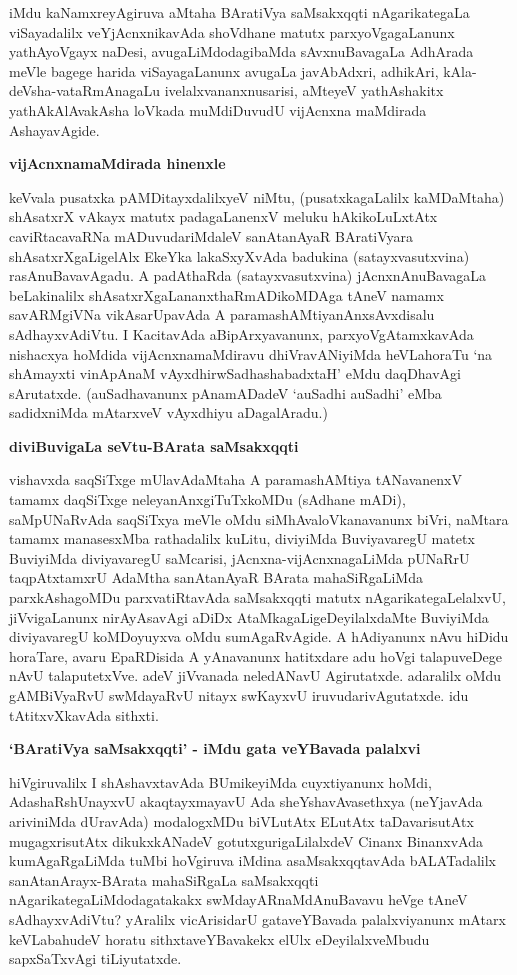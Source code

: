 iMdu kaNamxreyAgiruva aMtaha BAratiVya saMsakxqqti nAgarikategaLa viSayadalilx veYjAcnxnikavAda shoVdhane matutx parxyoVgagaLanunx yathAyoVgayx naDesi, avugaLiMdodagibaMda sAvxnuBavagaLa AdhArada meVle bagege harida viSayagaLanunx avugaLa javAbAdxri, adhikAri, kAla-deVsha-vataRmAnagaLu ivelalxvananxnusarisi, aMteyeV yathAshakitx yathAkAlAvakAsha loVkada muMdiDuvudU vijAcnxna maMdirada AshayavAgide.

\textbf{vijAcnxnamaMdirada hinenxle}

keVvala pusatxka pAMDitayxdalilxyeV niMtu, (pusatxkagaLalilx kaMDaMtaha) shAsatxrX vAkayx matutx padagaLanenxV meluku hAkikoLuLxtAtx caviRtacavaRNa mADuvudariMdaleV sanAtanAyaR BAratiVyara shAsatxrXgaLigelAlx EkeYka lakaSxyXvAda badukina (satayxvasutxvina) rasAnuBavavAgadu. A padAthaRda (satayxvasutxvina) jAcnxnAnuBavagaLa beLakinalilx shAsatxrXgaLananxthaRmADikoMDAga tAneV namamx 
savARMgiVNa vikAsarUpavAda A paramashAMtiyanAnxsAvxdisalu sAdhayxvAdiVtu. I KacitavAda aBipArxyavanunx, parxyoVgAtamxkavAda nishacxya hoMdida vijAcnxnamaMdiravu dhiVravANiyiMda heVLahoraTu `na shAmayxti vinApAnaM vAyxdhirwSadhashabadxtaH' eMdu daqDhavAgi sArutatxde. (auSadhavanunx pAnamADadeV `auSadhi auSadhi' eMba sadidxniMda mAtarxveV vAyxdhiyu aDagalAradu.)

\textbf{diviBuvigaLa seVtu-BArata saMsakxqqti}

vishavxda saqSiTxge mUlavAdaMtaha A paramashAMtiya tANavanenxV tamamx daqSiTxge neleyanAnxgiTuTxkoMDu (sAdhane mADi), saMpUNaRvAda saqSiTxya meVle oMdu siMhAvaloVkanavanunx biVri, naMtara tamamx manasesxMba rathadalilx kuLitu, diviyiMda BuviyavaregU matetx BuviyiMda diviyavaregU saMcarisi, jAcnxna-vijAcnxnagaLiMda pUNaRrU taqpAtxtamxrU AdaMtha sanAtanAyaR BArata mahaSiRgaLiMda parxkAshagoMDu parxvatiRtavAda saMsakxqqti matutx nAgarikategaLelalxvU, jiVvigaLanunx nirAyAsavAgi aDiDx AtaMkagaLigeDeyilalxdaMte BuviyiMda diviyavaregU koMDoyuyxva oMdu sumAgaRvAgide. A hAdiyanunx nAvu hiDidu horaTare, avaru EpaRDisida A yAnavanunx hatitxdare adu hoVgi talapuveDege nAvU talaputetxVve. adeV jiVvanada neledANavU Agirutatxde. adaralilx oMdu gAMBiVyaRvU swMdayaRvU nitayx swKayxvU iruvudarivAgutatxde. idu tAtitxvXkavAda sithxti.

\textbf{`BAratiVya saMsakxqqti' - iMdu gata veYBavada palalxvi}

hiVgiruvalilx I shAshavxtavAda BUmikeyiMda cuyxtiyanunx hoMdi, AdashaRshUnayxvU akaqtayxmayavU Ada sheYshavAvasethxya (neYjavAda ariviniMda dUravAda) modalogxMDu biVLutAtx ELutAtx taDavarisutAtx mugagxrisutAtx dikukxkANadeV gotutxgurigaLilalxdeV Cinanx BinanxvAda kumAgaRgaLiMda tuMbi hoVgiruva iMdina asaMsakxqqtavAda bALATadalilx sanAtanArayx-BArata mahaSiRgaLa saMsakxqqti nAgarikategaLiMdodagatakakx swMdayARnaMdAnuBavavu heVge tAneV sAdhayxvAdiVtu? yAralilx vicArisidarU gataveYBavada palalxviyanunx mAtarx keVLabahudeV horatu sithxtaveYBavakekx elUlx eDeyilalxveMbudu sapxSaTxvAgi tiLiyutatxde.

